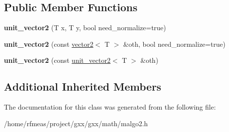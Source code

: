 \subsection*{Public Member Functions}
\begin{DoxyCompactItemize}
\item 
{\bfseries unit\+\_\+vector2} (T x, T y, bool need\+\_\+normalize=true)\hypertarget{classmalgo_1_1unit__vector2_a4173a5b2ea26d7092f380699fb023fb8}{}\label{classmalgo_1_1unit__vector2_a4173a5b2ea26d7092f380699fb023fb8}

\item 
{\bfseries unit\+\_\+vector2} (const \hyperlink{classmalgo_1_1vector2}{vector2}$<$ T $>$ \&oth, bool need\+\_\+normalize=true)\hypertarget{classmalgo_1_1unit__vector2_a8f84399dcbcd3501456e26a7f8490c01}{}\label{classmalgo_1_1unit__vector2_a8f84399dcbcd3501456e26a7f8490c01}

\item 
{\bfseries unit\+\_\+vector2} (const \hyperlink{classmalgo_1_1unit__vector2}{unit\+\_\+vector2}$<$ T $>$ \&oth)\hypertarget{classmalgo_1_1unit__vector2_a3d516ebc29079844b52005d0bc2da76f}{}\label{classmalgo_1_1unit__vector2_a3d516ebc29079844b52005d0bc2da76f}

\end{DoxyCompactItemize}
\subsection*{Additional Inherited Members}


The documentation for this class was generated from the following file\+:\begin{DoxyCompactItemize}
\item 
/home/rfmeas/project/gxx/gxx/math/malgo2.\+h\end{DoxyCompactItemize}
